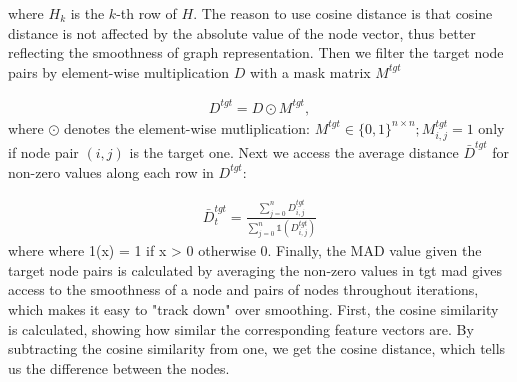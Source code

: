 where $H_{k}$ is the $k$-th row of $H$. The reason to use cosine distance is that cosine distance is not affected by the absolute value of the node vector,
thus better reflecting the smoothness of graph representation. Then we filter the target node pairs by element-wise multiplication $D$ with a mask matrix $M^{tgt}$

\begin{align*}
    D^{tgt} = D \odot M^{tgt},
\end{align*}
where $\odot$ denotes the element-wise mutliplication: $M^{tgt} \in \{0,1\}^{n \times n}; M_{i,j}^{tgt}= 1$ only if node pair $(i,j)$ is the target one.
Next we access the average distance $\bar{D}^{tgt}$ for non-zero values along each row in $D^{tgt}:$

\begin{align*}
    \bar{D}_{t}^{tgt} = \frac{\sum_{j=0}^{n}D_{i,j}^{tgt}}{\sum_{j=0}^{n}\mathds{1}(D_{i,j}^{tgt})}
\end{align*}
where where 1(x) = 1 if x > 0 otherwise 0. Finally, the MAD value given the target node pairs is calculated by averaging the non-zero values in tgt
\Ac{mad} gives access to the smoothness of a node and pairs of nodes throughout iterations, which makes it easy to "track down" over smoothing.
First, the cosine similarity is calculated, showing how similar the corresponding feature vectors are.
By subtracting the cosine similarity from one, we get the cosine distance, which tells us the difference between the nodes.
